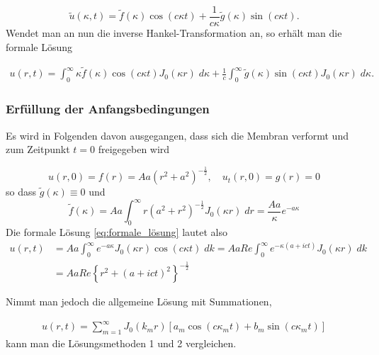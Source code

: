\begin{equation*}
	\tilde{u}(\kappa,t)=\tilde{f}(\kappa)\cos(c\kappa t) + \frac{1}{c\kappa}\tilde{g}(\kappa)\sin(c\kappa t).
\end{equation*}
Wendet man an nun die inverse Hankel-Transformation an, so erhält man die formale Lösung

\begin{align}
	u(r,t)=\int_{0}^{\infty}\kappa\tilde{f}(\kappa)\cos(c\kappa t) J_0(\kappa r) \; d\kappa +\frac{1}{c}\int_{0}^{\infty}\tilde{g}(\kappa)\sin(c\kappa t)J_0(\kappa r) \; d\kappa.
	\label{eq:formale_lösung}
\end{align}

\subsubsection{Erfüllung der Anfangsbedingungen\label{subsub:erfüllung_AB}}
Es wird in Folgenden davon ausgegangen, dass sich die Membran verformt und zum Zeitpunkt $t=0$ freigegeben wird

\begin{equation*}
	u(r,0)=f(r)=Aa(r^2 + a^2)^{-\frac{1}{2}}, \quad u_t(r,0)=g(r)=0
\end{equation*}
so dass $\tilde{g}(\kappa)\equiv 0$ und
\begin{equation*}
	\tilde{f}(\kappa)=Aa\int_{0}^{\infty}r(a^2 + r^2)^{-\frac{1}{2}} J_0 (\kappa r) \; dr=\frac{Aa}{\kappa}e^{-a\kappa}
\end{equation*}
Die formale Lösung  \eqref{eq:formale_lösung} lautet also
\begin{align*}
	u(r,t)&=Aa\int_{0}^{\infty}e^{-a\kappa} J_0(\kappa r)\cos(c\kappa t) \; dk=AaRe\int_{0}^{\infty}e^{-\kappa(a+ict)} J_0(\kappa r) \; dk\\
	&=AaRe\left\{r^2+\left(a+ict\right)^2\right\}^{-\frac{1}{2}}
\end{align*}

Nimmt man jedoch die allgemeine Lösung mit Summationen, 

\begin{align}
	u(r, t) = \displaystyle\sum_{m=1}^{\infty} J_0 (k_{m}r)[a_{m}\cos(c \kappa_{m} t)+b_{m}\sin(c \kappa_{m} t)]
	\label{eq:lösung_unendliche_generelle}
\end{align}
kann man die Lösungsmethoden 1 und 2 vergleichen.

